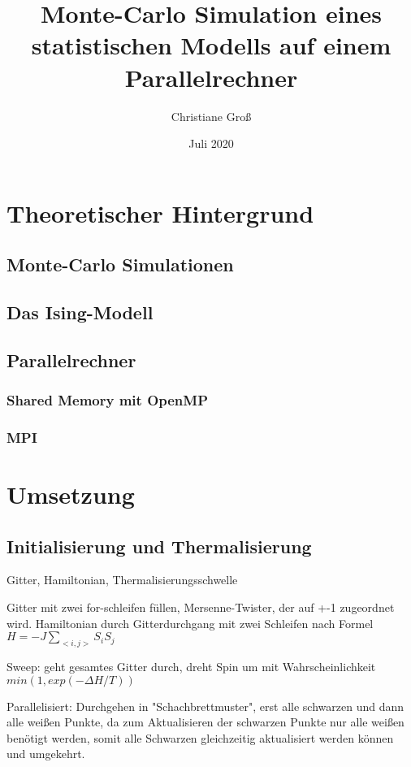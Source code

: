 \documentclass{scrreprt}
\title{Monte-Carlo Simulation eines statistischen Modells auf einem Parallelrechner}
\date{Juli 2020}
\author{Christiane Groß}
\begin{document}
	\maketitle
	
	
	\tableofcontents
	
	\clearpage
	
	\chapter{Theoretischer Hintergrund}
	\section{Monte-Carlo Simulationen}
	\section{Das Ising-Modell}
	\section{Parallelrechner}
	\subsection{Shared Memory mit OpenMP}
	\subsection{MPI}
	\chapter{Umsetzung}
	\section{Initialisierung und Thermalisierung}
	Gitter, Hamiltonian, Thermalisierungsschwelle
	
	Gitter mit zwei for-schleifen füllen, Mersenne-Twister, der auf +-1 zugeordnet wird.
	Hamiltonian durch Gitterdurchgang mit zwei Schleifen nach Formel $H=-J\sum_{<i,j>}S_iS_j$
	
	Sweep: geht gesamtes Gitter durch, dreht Spin um mit Wahrscheinlichkeit $min\left(1, exp(-\Delta H/T)\right) $
	
	Parallelisiert: Durchgehen in "Schachbrettmuster", erst alle schwarzen und dann alle weißen Punkte, da zum Aktualisieren der schwarzen Punkte nur alle weißen benötigt werden, somit alle Schwarzen gleichzeitig aktualisiert werden können und umgekehrt.
	
\end{document}
